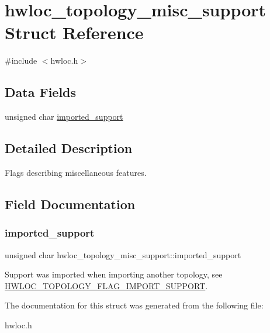 \hypertarget{a00302}{}\section{hwloc\+\_\+topology\+\_\+misc\+\_\+support Struct Reference}
\label{a00302}


{\ttfamily \#include $<$hwloc.\+h$>$}

\subsection*{Data Fields}
\begin{DoxyCompactItemize}
\item 
unsigned char \hyperlink{a00302_adf54a6dbe8e9dd5033dfe9c93df726c4}{imported\+\_\+support}
\end{DoxyCompactItemize}


\subsection{Detailed Description}
Flags describing miscellaneous features. 

\subsection{Field Documentation}
\mbox{\label{a00302_adf54a6dbe8e9dd5033dfe9c93df726c4}} 
\subsubsection{\texorpdfstring{imported\+\_\+support}{imported\_support}}
{\footnotesize\ttfamily unsigned char hwloc\+\_\+topology\+\_\+misc\+\_\+support\+::imported\+\_\+support}

Support was imported when importing another topology, see \hyperlink{a00193_ggada025d3ec20b4b420f8038d23d6e7bdead93e82b8668ee90e4f9354e201a2ed9c}{H\+W\+L\+O\+C\+\_\+\+T\+O\+P\+O\+L\+O\+G\+Y\+\_\+\+F\+L\+A\+G\+\_\+\+I\+M\+P\+O\+R\+T\+\_\+\+S\+U\+P\+P\+O\+RT}. 

The documentation for this struct was generated from the following file\+:\begin{DoxyCompactItemize}
\item 
hwloc.\+h\end{DoxyCompactItemize}
